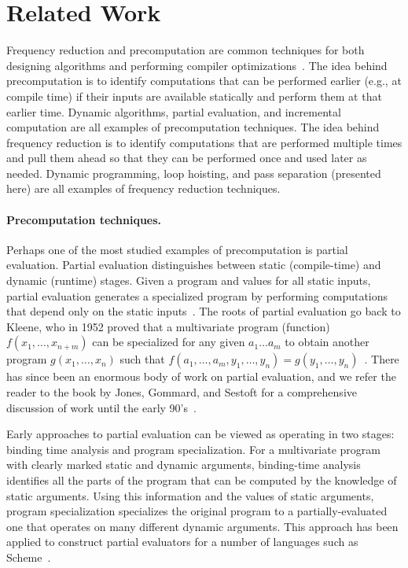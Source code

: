 
\section{Related Work}
\label{sec:related}

Frequency reduction and precomputation are common techniques for both
designing algorithms and performing compiler
optimizations~\cite{JS86-staging}.
%
The idea behind precomputation is to identify computations that can be
performed earlier (e.g., at compile time) if their inputs are
available statically and perform them at that earlier time. Dynamic
algorithms, partial evaluation, and incremental computation are all
examples of precomputation techniques.
%
The idea behind frequency
reduction is to identify computations that are performed multiple
times and pull them ahead so that they can be performed once and used
later as needed.  Dynamic programming, loop hoisting, and pass
separation (presented here) are all examples of frequency reduction
techniques.

\paragraph{Precomputation techniques.}
Perhaps one of the most studied examples of precomputation is
partial evaluation.  Partial evaluation distinguishes between static
(compile-time) and dynamic (runtime) stages. Given a program and values 
for all static inputs, partial evaluation generates a specialized program by
performing computations that depend only on the static
inputs~\cite{jones96}.  The roots of partial evaluation go back to
Kleene, who in 1952 proved that a multivariate program (function)
$f(x_1, \ldots, x_{n+m})$ can be specialized for any given $a_1 \ldots
a_m$ to obtain another program $g(x_1, \ldots, x_n)$ such that $f(a_1,
\ldots, a_m, y_1, \ldots, y_n) = g(y_1, \ldots, y_n)$~\cite{Kleene52}.
There has since been an enormous body of work on partial evaluation,
and we refer the reader to the book by Jones, Gommard, and Sestoft for
a comprehensive discussion of work until the early 90's~\cite{JGS93}.

Early approaches to partial evaluation can be viewed as operating in
two stages: binding time analysis and program specialization.  For a
multivariate program with clearly marked static and dynamic arguments,
binding-time analysis identifies all the parts of the program that can
be computed by the knowledge of static arguments. Using this
information and the values of static arguments, program specialization
specializes the original program to a partially-evaluated one that
operates on many different dynamic arguments.  This approach has been
applied to construct partial evaluators for a number of languages such
as Scheme~\cite{OB91-Similix,Consel88-Schism}.

